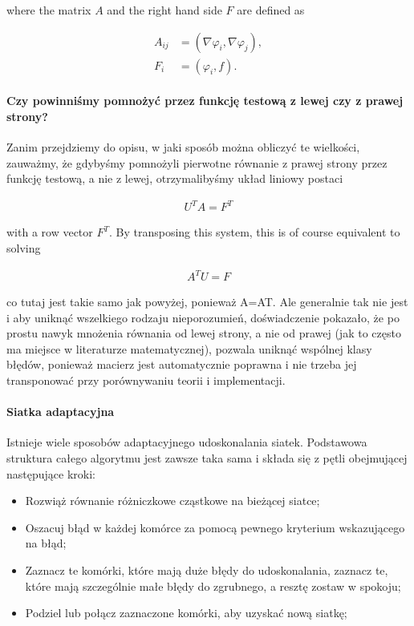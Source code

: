 \documentclass[]{pracamgr}
\begin{document}
      where the matrix $A$ and the right hand side $F$ are defined as

      \begin{align*}
        A_{ij} &= (\nabla\varphi_i, \nabla \varphi_j),
        \\
        F_i &= (\varphi_i, f).
      \end{align*}

      \paragraph{Czy powinniśmy pomnożyć przez funkcję testową z lewej czy z prawej strony?}

        Zanim przejdziemy do opisu, w jaki sposób można obliczyć te wielkości, zauważmy, że gdybyśmy pomnożyli pierwotne równanie z prawej strony przez funkcję testową, a nie z lewej, otrzymalibyśmy układ liniowy postaci

        \begin{align*}
          U^T A = F^T
        \end{align*}

        with a row vector $F^T$. By transposing this system, this is of course equivalent to solving

        \begin{align*}
          A^T U = F
        \end{align*}

        co tutaj jest takie samo jak powyżej, ponieważ A=AT. Ale generalnie tak nie jest i aby uniknąć wszelkiego rodzaju nieporozumień, doświadczenie pokazało, że po prostu nawyk mnożenia równania od lewej strony, a nie od prawej (jak to często ma miejsce w literaturze matematycznej), pozwala uniknąć wspólnej klasy błędów, ponieważ macierz jest automatycznie poprawna i nie trzeba jej transponować przy porównywaniu teorii i implementacji.
      
      \paragraph{Siatka adaptacyjna}

        Istnieje wiele sposobów adaptacyjnego udoskonalania siatek. Podstawowa struktura całego algorytmu jest zawsze taka sama i składa się z pętli obejmującej następujące kroki:

        \begin{itemize}
          \item Rozwiąż równanie różniczkowe cząstkowe na bieżącej siatce;
          \item Oszacuj błąd w każdej komórce za pomocą pewnego kryterium wskazującego na błąd;
          \item Zaznacz te komórki, które mają duże błędy do udoskonalania, zaznacz te, które mają szczególnie małe błędy do zgrubnego, a resztę zostaw w spokoju;
          \item Podziel lub połącz zaznaczone komórki, aby uzyskać nową siatkę;
        \end{itemize}
\end{document}
